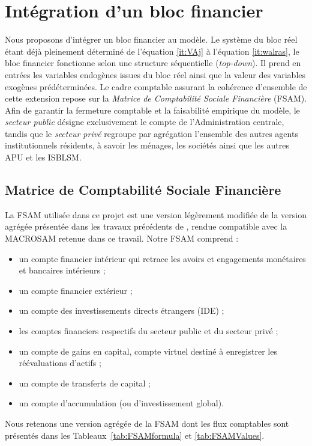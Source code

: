 \documentclass[11pt,a4paper]{article}
\begin{document}
	\section{Intégration d'un bloc financier}    
	Nous proposons d'intégrer un bloc financier au modèle. Le système du bloc réel étant déjà pleinement déterminé de l'équation \eqref{it:VAj} à l'équation \eqref{it:walras}, le bloc financier fonctionne selon une structure séquentielle (\textit{top-down}). Il prend en entrées les variables endogènes issues du bloc réel ainsi que la valeur des variables exogènes prédéterminées. Le cadre comptable assurant la cohérence d'ensemble de cette extension repose sur la \textit{Matrice de Comptabilité Sociale Financière} (FSAM). Afin de garantir la fermeture comptable et la faisabilité empirique du modèle, le \textit{secteur public} désigne exclusivement le compte de l'Administration centrale, tandis que le \textit{secteur privé} regroupe par agrégation l'ensemble des autres agents institutionnels résidents, à savoir les ménages, les sociétés ainsi que les autres APU et les ISBLSM.
	
	
	\subsection{Matrice de Comptabilité Sociale Financière}
	La FSAM utilisée dans ce projet est une version légèrement modifiée de la version agrégée présentée dans les travaux précédents de \cite{Ramaharo2022}, rendue compatible avec la MACROSAM retenue dans ce travail. Notre FSAM comprend :
	\begin{itemize}
		\item un compte financier intérieur qui retrace les avoirs et engagements monétaires et bancaires intérieurs ;
		\item un compte financier extérieur ;
		\item un compte des investissements directs étrangers (IDE) ;
		\item les comptes financiers respectifs du secteur public et du secteur privé ;
		\item un compte de gains en capital, compte virtuel destiné à enregistrer les réévaluations d'actifs ;
		\item un compte de transferts de capital ;
		\item un compte d'accumulation (ou d'investissement global).
	\end{itemize}
	
	Nous retenons une version agrégée de la FSAM dont les flux comptables sont présentés dans les Tableaux~\ref{tab:FSAMformula} et \ref{tab:FSAMValues}.
	
\end{document}
